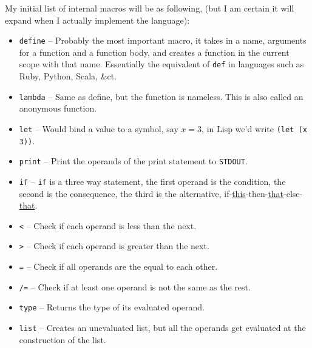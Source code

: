 \documentclass{article}
\newcommand{\code}[1]{\texttt{#1}}
\newcommand{\etc}{{\&}ct.}
\begin{document}
      \clearpage
      My initial list of internal macros will be as following, (but I am certain
      it will expand when I actually implement the language):

      \begin{itemize}
        \item \code{define} -- Probably the most important macro, it takes in a
                               name, arguments for a function and a function body,
                               and creates a
                               function in the current scope with that name.
                               Essentially the equivalent of \code{def} in
                               languages such as Ruby, Python, Scala, \etc

        \item \code{lambda} -- Same as define, but the function is nameless.
                               This is also called an anonymous function.

        \item \code{let} -- Would bind a value to a symbol, say $x = 3$, in Lisp
                            we'd write \code{(let (x 3))}.

        \item \code{print} -- Print the operands of the print statement to \code{STDOUT}.
        \item \code{if} -- \code{if} is a three way statement, the first operand is the
                           condition, the second is the consequence, the third
                           is the alternative,
                           if-\underline{this}-then-\underline{that}-else-\underline{that}.

        \item \code{<} -- Check if each operand is less than the next.
        \item \code{>} -- Check if each operand is greater than the next.
        \item \code{=} -- Check if all operands are the equal to each other.
        \item \code{/=} -- Check if at least one operand is not the same as the rest.

        \item \code{type} -- Returns the type of its evaluated operand.

        \item \code{list} -- Creates an unevaluated list, but all the operands
                             get evaluated at the construction of the list.




\end{itemize}
\end{document}
